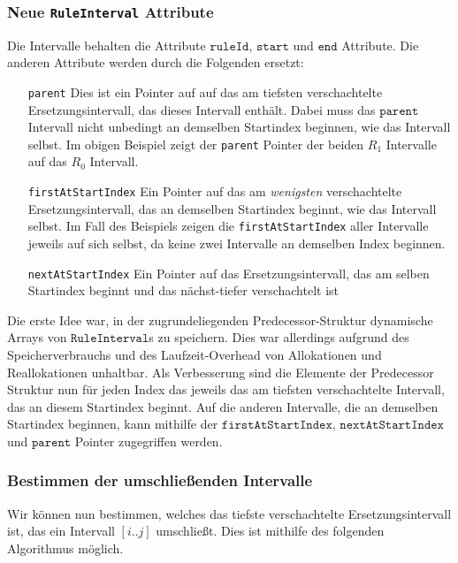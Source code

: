 \subsubsection{Neue \texttt{RuleInterval} Attribute}

Die Intervalle behalten die Attribute $\texttt{ruleId}$, $\texttt{start}$ und $\texttt{end}$ Attribute. Die anderen Attribute werden durch die Folgenden ersetzt:

\begin{itemize}[leftmargin=3cm]
    \item[\texttt{parent}] Dies ist ein Pointer auf auf das am tiefsten verschachtelte Ersetzungsintervall, das dieses Intervall enthält. Dabei muss das $\texttt{parent}$ Intervall nicht unbedingt an demselben Startindex beginnen, wie das Intervall selbst. Im obigen Beispiel zeigt der \texttt{parent} Pointer der beiden $R_1$ Intervalle auf das $R_0$ Intervall.
    \item[\texttt{firstAtStartIndex}] Ein Pointer auf das am \emph{wenigsten} verschachtelte Ersetzungsintervall, das an demselben Startindex beginnt, wie das Intervall selbst. Im Fall des Beispiels zeigen die \texttt{firstAtStartIndex} aller Intervalle jeweils auf sich selbst, da keine zwei Intervalle an demselben Index beginnen.
    \item[\texttt{nextAtStartIndex}] Ein Pointer auf das Ersetzungsintervall, das am selben Startindex beginnt und das nächst-tiefer verschachtelt ist
\end{itemize}

Die erste Idee war, in der zugrundeliegenden Predecessor-Struktur dynamische Arrays von $\texttt{RuleInterval}$s zu speichern. Dies war allerdings aufgrund des Speicherverbrauchs und des Laufzeit-Overhead von Allokationen und Reallokationen unhaltbar. Als Verbesserung sind die Elemente der Predecessor Struktur nun für jeden Index das jeweils das am tiefsten verschachtelte Intervall, das an diesem Startindex beginnt. Auf die anderen Intervalle, die an demselben Startindex beginnen, kann mithilfe der $\texttt{firstAtStartIndex}$, $\texttt{nextAtStartIndex}$ und $\texttt{parent}$ Pointer zugegriffen werden.

\subsubsection{Bestimmen der umschließenden Intervalle}
Wir können nun bestimmen, welches das tiefste verschachtelte Ersetzungsintervall ist, das ein Intervall $[i..j]$ umschließt.
Dies ist mithilfe des folgenden Algorithmus möglich.

